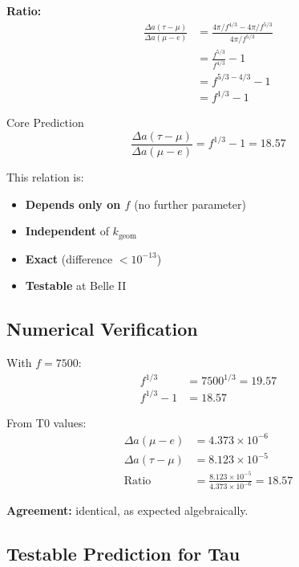 	\textbf{Ratio:}
	\begin{align}
		\frac{\Delta a(\tau - \mu)}{\Delta a(\mu - e)} &= \frac{4\pi/f^{4/3} - 4\pi/f^{5/3}}{4\pi/f^{5/3}} \\
		&= \frac{f^{5/3}}{f^{4/3}} - 1 \\
		&= f^{5/3 - 4/3} - 1 \\
		&= f^{1/3} - 1
		\label{eq:ratio}
	\end{align}
	
	\begin{important}{Core Prediction}
		\begin{equation}
			\boxed{\frac{\Delta a(\tau - \mu)}{\Delta a(\mu - e)} = f^{1/3} - 1 = 18.57}
		\end{equation}
		
		This relation is:
		\begin{itemize}
			\item \textbf{Depends only on $f$} (no further parameter)
			\item \textbf{Independent} of $k_{\text{geom}}$
			\item \textbf{Exact} (difference $< 10^{-13}$)
			\item \textbf{Testable} at Belle II
		\end{itemize}
	\end{important}
	
	\subsection{Numerical Verification}
	
	With $f = 7500$:
	\begin{align}
		f^{1/3} &= 7500^{1/3} = 19.57 \\
		f^{1/3} - 1 &= 18.57
	\end{align}
	
	From T0 values:
	\begin{align}
		\Delta a(\mu - e) &= 4.373 \times 10^{-6} \\
		\Delta a(\tau - \mu) &= 8.123 \times 10^{-5} \\
		\text{Ratio} &= \frac{8.123 \times 10^{-5}}{4.373 \times 10^{-6}} = 18.57
	\end{align}
	
	\textbf{Agreement:} identical, as expected algebraically.
	
	\subsection{Testable Prediction for Tau}
	
